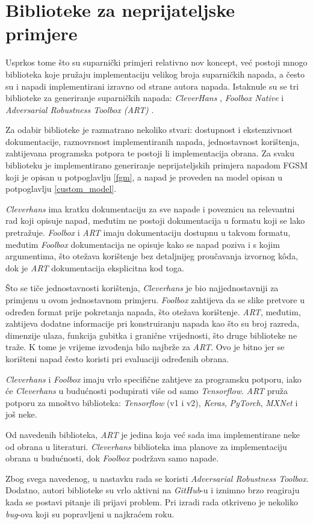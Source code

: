 \documentclass[utf8, diplomski]{fer}
\begin{document}
\section{Biblioteke za neprijateljske primjere}
Usprkos tome što su suparnički primjeri relativno nov koncept, već postoji mnogo biblioteka koje pružaju implementaciju velikog broja suparničkih napada, a često su i napadi implementirani izravno od strane autora napada. Istaknule su se tri biblioteke za generiranje suparničkih napada: \textit{CleverHans} \citep{papernot2018cleverhans}, \textit{Foolbox Native} \citep{rauber2017foolbox} i \textit{Adversarial Robustness Toolbox (ART)} \citep{art2018}.
\par
Za odabir biblioteke je razmatrano nekoliko stvari: dostupnost i ekstenzivnost dokumentacije, raznovrsnost implementiranih napada, jednostavnost korištenja, zahtijevana programska potpora te postoji li implementacija obrana. Za svaku biblioteku je implementirano generiranje neprijateljskih primjera napadom FGSM koji je opisan u potpoglavlju \ref{fgm}, a napad je proveden na model opisan u potpoglavlju \ref{custom_model}.
\par
\textit{Cleverhans} ima kratku dokumentaciju za sve napade i poveznicu na relevantni rad koji opisuje napad, međutim ne postoji dokumentacija u formatu koji se lako pretražuje. \textit{Foolbox} i \textit{ART} imaju dokumentaciju dostupnu u takvom formatu, međutim \textit{Foolbox} dokumentacija ne opisuje kako se napad poziva i s kojim argumentima, što otežava korištenje bez detaljnijeg proučavanja izvornog kôda, dok je \textit{ART} dokumentacija eksplicitna kod toga.
\par
Što se tiče jednostavnosti korištenja, \textit{Cleverhans} je bio najjednostavniji za primjenu u ovom jednostavnom primjeru. \textit{Foolbox} zahtijeva da se slike pretvore u određen format prije pokretanja napada, što otežava korištenje. \textit{ART}, međutim, zahtijeva dodatne informacije pri konstruiranju napada kao što su broj razreda, dimenzije ulaza, funkcija gubitka i granične vrijednosti, što druge biblioteke ne traže. K tome je vrijeme izvođenja bilo najbrže za \textit{ART}. Ovo je bitno jer se korišteni napad često koristi pri evaluaciji određenih obrana.
\par
\textit{Cleverhans} i \textit{Foolbox} imaju vrlo specifične zahtjeve za programsku potporu, iako će \textit{Cleverhans} u budućnosti podupirati više od samo \textit{Tensorflow}. \textit{ART} pruža potporu za mnoštvo biblioteka: \textit{Tensorflow} (v1 i v2), \textit{Keras}, \textit{PyTorch}, \textit{MXNet} i još neke.
\par
Od navedenih biblioteka, \textit{ART} je jedina koja već sada ima implementirane neke od obrana u literaturi. \textit{Cleverhans} biblioteka ima planove za implementaciju obrana u budućnosti, dok \textit{Foolbox} podržava samo napade.
\par
Zbog svega navedenog, u nastavku rada se koristi \textit{Adversarial Robustness Toolbox}. Dodatno, autori biblioteke su vrlo aktivni na \textit{GitHub}-u i iznimno brzo reagiraju kada se postavi pitanje ili prijavi problem. Pri izradi rada otkriveno je nekoliko \textit{bug}-ova koji su popravljeni u najkraćem roku.
\end{document}
